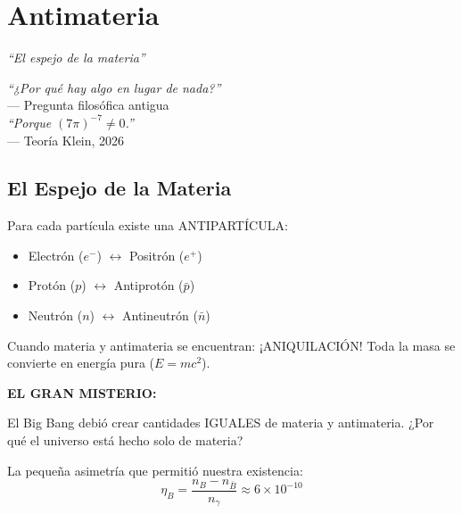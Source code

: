 \chapter{Antimateria}
\label{cap:antimateria}

\begin{center}
\textit{``El espejo de la materia''}
\end{center}

\vspace{0.5cm}

\begin{tcolorbox}[colback=white, colframe=kleinblue, boxrule=2pt]
\centering
\textit{``¿Por qué hay algo en lugar de nada?''}\\
--- Pregunta filosófica antigua\\[0.3cm]
\textit{``Porque $(7\pi)^{-7} \neq 0$.''}\\
--- Teoría Klein, 2026
\end{tcolorbox}


\section{El Espejo de la Materia}

Para cada partícula existe una ANTIPARTÍCULA:
\begin{itemize}
    \item Electrón ($e^-$) $\leftrightarrow$ Positrón ($e^+$)
    \item Protón ($p$) $\leftrightarrow$ Antiprotón ($\bar{p}$)
    \item Neutrón ($n$) $\leftrightarrow$ Antineutrón ($\bar{n}$)
\end{itemize}

Cuando materia y antimateria se encuentran: ¡ANIQUILACIÓN!
Toda la masa se convierte en energía pura ($E = mc^2$).

\textbf{EL GRAN MISTERIO:}

El Big Bang debió crear cantidades IGUALES de materia y antimateria.
¿Por qué el universo está hecho solo de materia?

La pequeña asimetría que permitió nuestra existencia:
\begin{equation}
\eta_B = \frac{n_B - n_{\bar{B}}}{n_\gamma} \approx 6 \times 10^{-10}
\end{equation}

